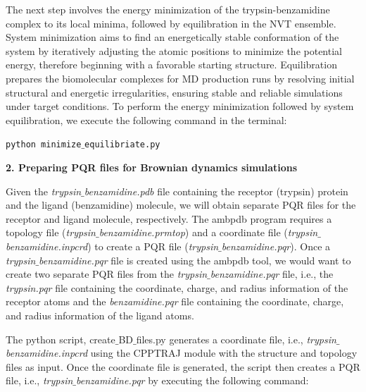 \documentclass[9pt,training,pubversion]{livecoms}
\begin{document}
\noindent The next step involves the energy minimization of the trypsin-benzamidine complex to its local minima, followed by equilibration in the NVT ensemble. System minimization aims to find an energetically stable conformation of the system by iteratively adjusting the atomic positions to minimize the potential energy, therefore beginning with a favorable starting structure. Equilibration prepares the biomolecular complexes for MD production runs by resolving initial structural and energetic irregularities, ensuring stable and reliable simulations under target conditions. To perform the energy minimization followed by system equilibration, we execute the following command in the terminal:

\begin{tcolorbox}[colback=black!8!white, colframe=black!50!black, fontlower=\tiny, left=2pt, right=2pt, top=2pt, bottom=2pt] 
\texttt{python minimize$\_$equilibriate.py}
\end{tcolorbox}

\vspace{2mm}
\noindent \textbf{2. Preparing PQR files for Brownian dynamics simulations} \par
\vspace{2mm}

\noindent Given the \textit{trypsin$\_$benzamidine.pdb} file containing the receptor (trypsin) protein and the ligand (benzamidine) molecule, we will obtain separate PQR files for the receptor and ligand molecule, respectively. The ambpdb program requires a topology file (\textit{trypsin$\_$benzamidine.prmtop}) and a coordinate file (\textit{trypsin$\_$benzamidine.inpcrd}) to create a PQR file (\textit{trypsin$\_$benzamidine.pqr}). Once a \textit{trypsin$\_$benzamidine.pqr} file is created using the ambpdb tool, we would want to create two separate PQR files from the \textit{trypsin$\_$benzamidine.pqr} file, i.e., the \textit{trypsin.pqr} file containing the coordinate, charge, and radius information of the receptor atoms and the \textit{ benzamidine.pqr} file containing the coordinate, charge, and radius information of the ligand atoms. \par

\noindent The python script, create$\_$BD$\_$files.py generates a coordinate file, i.e., \textit{trypsin$\_$benzamidine.inpcrd} using the CPPTRAJ module with the structure and topology files as input. Once the coordinate file is generated, the script then creates a PQR file, i.e., \textit{trypsin$\_$benzamidine.pqr} by executing the following command:
\end{document}
